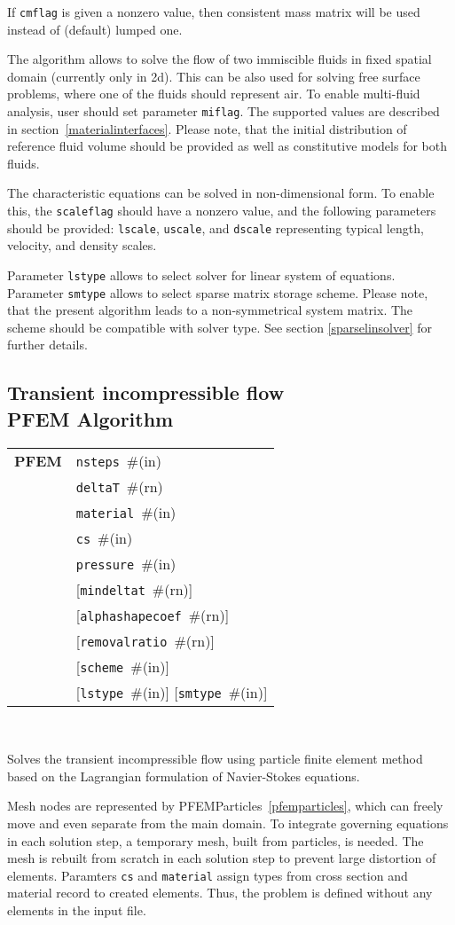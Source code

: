 \documentclass[a4paper]{article}
\makeatletter
\newcommand{\param}[1]{\texttt{#1}} %
\newcommand{\optional}[1]{[#1]} %
\newcommand{\field}[2]{\param{#1}~\#{\tiny(#2)}} %
\newcommand{\optField}[2]{\optional{\field{#1}{#2}}}
\newcommand{\entKeywordInst}[1]{\textbf{#1}} %
\newenvironment{record}[1][]{\begin{tabular}{|ll}}{\end{tabular}\\}
\newcommand{\recentry}[2]{{#1}&{#2}\\}
\newcounter{rcc}
\newenvironment{record}[1][\textwidth]{\setcounter{rcc}{0}\begin{tabular*}{#1}{|ll@{\extracolsep{\fill}}r}}{\end{tabular*}\\}
\newcommand{\recentry}[2]{\ifthenelse{\value{rcc}>0}{&$\backslash$ \\}{\setcounter{rcc}{1}}{#1}&{#2}}
\makeatother
\begin{document}
If \param{cmflag} is given a nonzero value, then
consistent mass matrix will be used instead of (default) lumped one.

The algorithm allows to solve the flow of two immiscible fluids in
fixed spatial domain (currently only in 2d). This can be also used for
solving free surface problems, where one of the fluids should
represent air. To enable multi-fluid analysis, user should set parameter \param{miflag}. The supported values are described in section~\ref{materialinterfaces}.
Please note, that the initial distribution of reference fluid
volume should be provided as well as
constitutive models for both fluids.


The characteristic equations can be solved in non-dimensional form. To
enable this, the \param{scaleflag} should have a nonzero value,
and the following parameters should be provided: \param{lscale},
\param{uscale}, and \param{dscale} representing typical length,
velocity, and density scales.

Parameter \param{lstype} allows to select solver for linear system of
equations. Parameter \param{smtype} allows to select sparse matrix storage
scheme. Please note, that the present algorithm leads to a
non-symmetrical system
matrix. The scheme should be compatible with solver type. See section
\ref{sparselinsolver} for further details.

\subsection{Transient incompressible flow\\PFEM Algorithm}
\label{pfemIncomp}
\begin{record}
  \recentry{\entKeywordInst{PFEM}}{\field{nsteps}{in}}
  \recentry{}{\field{deltaT}{rn}}
  \recentry{}{\field{material}{in}}
  \recentry{}{\field{cs}{in}}
  \recentry{}{\field{pressure}{in}}
  \recentry{}{\optField{mindeltat}{rn}}
  \recentry{}{\optField{alphashapecoef}{rn}}
  \recentry{}{\optField{removalratio}{rn}}
  \recentry{}{\optField{scheme}{in}}
  \recentry{}{\optField{lstype}{in} \optField{smtype}{in}}
\end{record}

Solves the transient incompressible flow using particle finite element
method based on the Lagrangian formulation of Navier-Stokes equations.

Mesh nodes are represented by PFEMParticles~\ref{pfemparticles}, which 
can freely move and even separate from the main domain. To integrate 
governing equations in each solution step, a temporary mesh, built from 
particles, is needed. The mesh is rebuilt from scratch in each solution 
step to prevent large distortion of elements. Paramters \param{cs} and
\param{material} assign types from cross section and material record to 
created elements. Thus, the problem is defined without any elements in
the input file.
\end{document}
